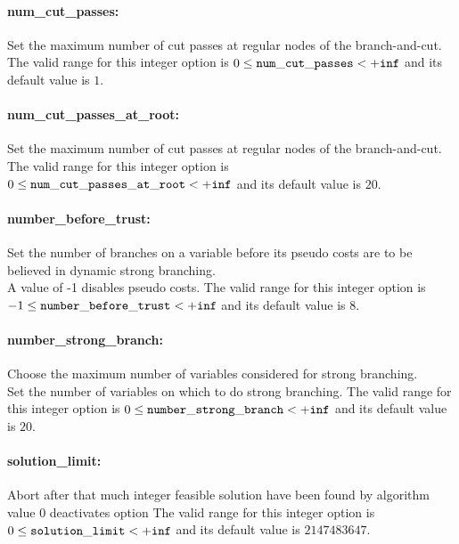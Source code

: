 \paragraph{num\_cut\_passes:} Set the maximum number of cut passes at regular nodes of the branch-and-cut. $\;$ \\
 The valid range for this integer option is
$0 \le {\tt num\_cut\_passes } <  {\tt +inf}$
and its default value is $1$.


\paragraph{num\_cut\_passes\_at\_root:} Set the maximum number of cut passes at regular nodes of the branch-and-cut. $\;$ \\
 The valid range for this integer option is
$0 \le {\tt num\_cut\_passes\_at\_root } <  {\tt +inf}$
and its default value is $20$.


\paragraph{number\_before\_trust:} Set the number of branches on a variable before its pseudo costs are to be believed in dynamic strong branching. $\;$ \\
 A value of -1 disables pseudo costs. The valid range for this integer option is
$-1 \le {\tt number\_before\_trust } <  {\tt +inf}$
and its default value is $8$.


\paragraph{number\_strong\_branch:} Choose the maximum number of variables considered for strong branching. $\;$ \\
 Set the number of variables on which to do strong
branching. The valid range for this integer option is
$0 \le {\tt number\_strong\_branch } <  {\tt +inf}$
and its default value is $20$.


\paragraph{solution\_limit:} Abort after that much integer feasible solution have been found by algorithm $\;$ \\
 value 0 deactivates option The valid range for this integer option is
$0 \le {\tt solution\_limit } <  {\tt +inf}$
and its default value is $2147483647$.



